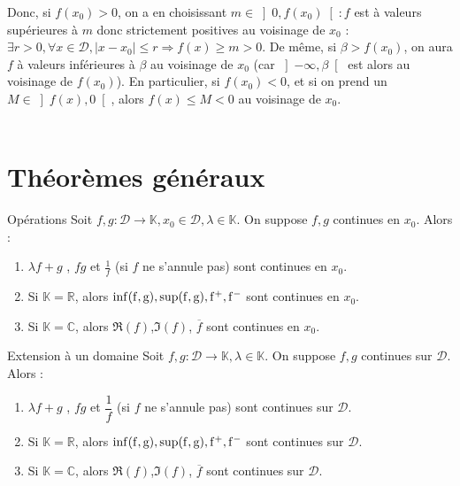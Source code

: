 \documentclass[12pt,a4paper]{report}
\begin{document}
\begin{principedemo}{}

\end{principedemo}

\begin{remarque}
Donc, si $f(x_0) > 0$, on a en choisissant $m \in \left] 0, f(x_0) \right[ : f$ est à valeurs supérieures à $m$ donc strictement positives au voisinage de $x_0$ : 
\newline $\exists r > 0, \forall x \in \mathcal{D}, \lvert x-x_0 \rvert \leq r \Longrightarrow f(x) \geq m > 0$. \newline
De même, si $\beta > f(x_0)$, on aura $f$ à valeurs inférieures à $\beta$ au voisinage de $x_0$ (car $\left] -\infty, \beta \right[$ est alors au voisinage de $f(x_0)$). \newline En particulier, si $f(x_0) < 0$, et si on prend un $M \in \left] f(x), 0 \right[$, alors $f(x) \leq M < 0$ au voisinage de $x_0$.\\
\\
\end{remarque}


\section{Théorèmes généraux}

\begin{theoreme}{Opérations}{}
Soit $f, g : \mathcal{D} \rightarrow \mathbb{K}, x_0 \in \mathcal{D}, \lambda \in \mathbb{K}$. On suppose $f,g$ continues en $x_0$. Alors :
\begin{enumerate}
\item $\lambda f + g$     , $fg$     et $\frac{1}{f}$ (si $f$ ne s'annule pas) sont continues en $x_0$.
\item Si $\mathbb{K}=\mathbb{R}$, alors $\rm{inf}(f,g) ,  \rm{sup}(f,g) , f^+ , f^-$ sont continues en $x_0$.
\item Si $\mathbb{K}=\mathbb{C}$, alors $\Re(f)$,$\Im(f)$, $\overline{f}$ sont continues en $x_0$.
\end{enumerate}
\end{theoreme} 

\pagebreak

\begin{theoreme}{Extension à un domaine}{}
Soit $f, g : \mathcal{D} \rightarrow \mathbb{K}, \lambda \in \mathbb{K}$. On suppose $f,g$ continues sur $\mathcal{D}$. Alors :
\begin{enumerate}
\item $\lambda f + g$     , $fg$     et $\dfrac{1}{f}$ (si $f$ ne s'annule pas) sont continues sur $\mathcal{D}$.
\item Si $\mathbb{K}=\mathbb{R}$, alors $\rm{inf}(f,g) ,  \rm{sup}(f,g) , f^+ , f^-$ sont continues sur $\mathcal{D}$.
\item Si $\mathbb{K}=\mathbb{C}$, alors $\Re(f)$,$\Im(f)$, $\overline{f}$ sont continues sur $\mathcal{D}$.
\end{enumerate}
\end{theoreme} 
\end{document}
